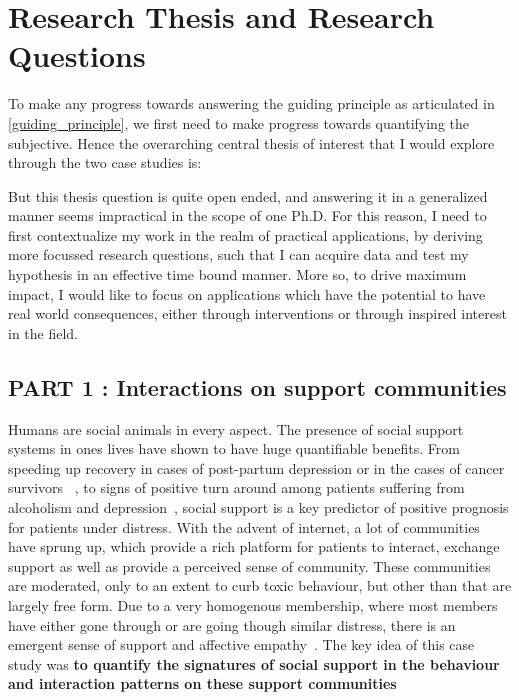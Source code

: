 \section{Research Thesis and Research Questions}
To make any progress towards answering the guiding principle as articulated in \ref{guiding_principle}, we first need to make progress towards quantifying the subjective.
Hence the overarching central thesis of interest that I would explore through the two case studies is:

\vspace{0.5cm}
\noindent{}
\vspace{0.5cm} 

But this thesis question is quite open ended, and answering it in a generalized manner seems impractical in the scope of one Ph.D. For this reason, I need to first contextualize my work in the realm  of practical applications, by deriving more focussed research questions, such that I can acquire data and test my hypothesis in an effective time bound manner. More so, to drive maximum impact, I would like to focus on applications which have the potential to have real world consequences, either through interventions or through inspired interest in the field.

\subsection{PART 1 : Interactions on support communities}
Humans are social animals in every aspect. The presence of social support systems in ones lives have shown to have huge quantifiable benefits. From speeding up recovery in cases of post-partum depression or in the cases of cancer survivors~\cite{collins1993social,dunkel1984social,baron1990social} , to signs of positive turn around among patients suffering from alcoholism and depression~\cite{peirce2000longitudinal,brown1986social}, social support is a key predictor of positive prognosis for patients under distress. With the advent of internet, a lot of communities have sprung up, which provide a rich platform for patients to interact, exchange support as well as provide a perceived sense of community. 
These communities are moderated, only to an extent to curb toxic behaviour, but other than that are largely free form. Due to a very homogenous membership, where most members have either gone through or are going though similar distress, there is an emergent sense of support and affective empathy~\cite{de2016stroke}. The key idea of this case study was \textbf{to quantify the signatures of social support in the behaviour and interaction patterns on these support communities} 

